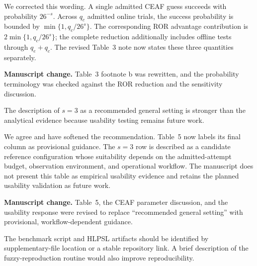 \begin{revresponse}
We corrected this wording. A single admitted CEAF guess succeeds with probability $26^{-s}$. Across $q_c$ admitted online trials, the success probability is bounded by $\min\{1,q_c/26^s\}$. The corresponding ROR advantage contribution is $2\min\{1,q_c/26^s\}$; the complete reduction additionally includes offline tests through $q_e+q_c$. The revised Table~3 note now states these three quantities separately.
\end{revresponse}
\begin{changes}
\textbf{Manuscript change.} Table~3 footnote b was rewritten, and the probability terminology was checked against the ROR reduction and the sensitivity discussion.
\end{changes}

\begin{revcomment}
The description of $s=3$ as a recommended general setting is stronger than the analytical evidence because usability testing remains future work.
\end{revcomment}

\begin{revresponse}
We agree and have softened the recommendation. Table~5 now labels its final column as provisional guidance. The $s=3$ row is described as a candidate reference configuration whose suitability depends on the admitted-attempt budget, observation environment, and operational workflow. The manuscript does not present this table as empirical usability evidence and retains the planned usability validation as future work.
\end{revresponse}
\begin{changes}
\textbf{Manuscript change.} Table~5, the CEAF parameter discussion, and the usability response were revised to replace ``recommended general setting'' with provisional, workflow-dependent guidance.
\end{changes}

\begin{revcomment}
The benchmark script and HLPSL artifacts should be identified by supplementary-file location or a stable repository link. A brief description of the fuzzy-reproduction routine would also improve reproducibility.
\end{revcomment}


